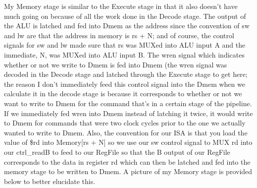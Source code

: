 \documentclass[letterpaper]{article} %
\begin{document}
    My Memory stage is similar to the Execute stage in that it also doesn't have much going on because of all the work done in the Decode stage. The output of the ALU is latched and fed into Dmem as the address since the convention of sw and lw are that the address in memory is rs + N; and of course, the control signals for sw and lw made sure that rs was MUXed into ALU input A and the immediate, N, was MUXed into ALU input B. The wren signal which indicates whether or not we write to Dmem is fed into Dmem (the wren signal was decoded in the Decode stage and latched through the Execute stage to get here; the reason I don't immediately feed this control signal into the Dmem when we calculate it in the decode stage is because it corresponds to whether or not we want to write to Dmem for the command that's in a certain stage of the pipeline. If we immediately fed wren into Dmem instead of latching it twice, it would write to Dmem for commands that were two clock cycles prior to the one we actually wanted to write to Dmem. Also, the convention for our ISA is that you load the value of \$rd into Memory[rs + N] so we use our sw control signal to MUX rd into our ctrl\_readB to feed to our RegFile so that the B output of our RegFile corresponds to the data in register rd which can then be latched and fed into the memory stage to be written to Dmem. A picture of my Memory stage is provided below to better elucidate this. \\
        
               \FloatBarrier
\end{document}
